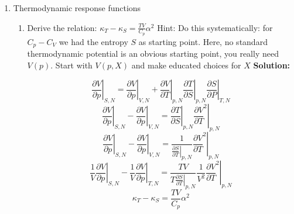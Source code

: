\documentclass[10pt]{article}
\newenvironment{Solution}
    {\textbf{Solution:}
    
    \vspace{5mm}
    \begin{tcolorbox}
    }
    {
    \end{tcolorbox}
    \vspace{5mm}
    }
\begin{document}

\begin{enumerate}


\item Thermodynamic response functions
\begin{enumerate}

\item Derive the relation: $\kappa_{T}-\kappa_{S}=\frac{T V}{C_{p}} \alpha^{2}$
Hint: Do this systematically: for $C_{p}-C_{V}$ we had the entropy $S$ as starting point. Here, no standard thermodynamic potential is an obvious starting point, you really need $V(p) .$ Start with $V(p, X)$ and make educated choices for $X$
\begin{Solution}

\begin{equation}
    \left.\frac{\partial V}{\partial p}\right|_{S,N} =   \left.\frac{\partial V}{\partial p}\right|_{V,N} + 
    \left.\frac{\partial V}{\partial T}\right|_{p,N} 
    \left.\frac{\partial T}{\partial S}\right|_{p,N}
    \left.\frac{\partial S}{\partial P}\right|_{T,N}
\end{equation}
\begin{equation}
    \left.\frac{\partial V}{\partial p}\right|_{S,N} - \left.\frac{\partial V}{\partial p}\right|_{V,N} =     \left.\frac{\partial T}{\partial S}\right|_{p,N} \left.{\frac{\partial V}{\partial T}}^2 \right|_{p,N}
\end{equation}
\begin{equation}
    \left.\frac{\partial V}{\partial p}\right|_{S,N} - \left.\frac{\partial V}{\partial p}\right|_{V,N} = \frac{1}{\left.\frac{\partial S}{\partial T}\right|_{p,N}}     \left.{\frac{\partial V}{\partial T}}^2\right|_{p,N} 
\end{equation}
\begin{equation}
    \frac{1}{V}\left.\frac{\partial V}{\partial p}\right|_{S,N} - \frac{1}{V}\left.\frac{\partial V}{\partial p}\right|_{T,N} = \frac{TV}{T\left.\frac{\partial S}{\partial T}\right|_{p,N}} \frac{1}{V^2}    \left.{\frac{\partial V}{\partial T}}^2\right|_{p,N} 
\end{equation}
\begin{equation}
    \kappa_{T}-\kappa_{S}=\frac{T V}{C_{p}} \alpha^{2}
\end{equation}


\end{Solution}
\end{enumerate}
\end{enumerate}
\end{document}
